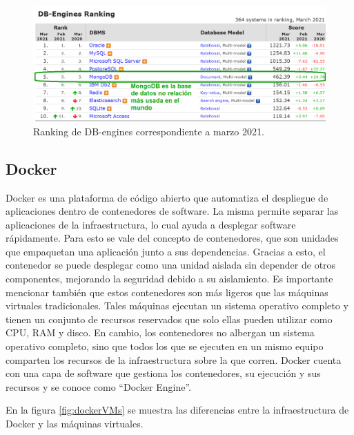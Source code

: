 \begin{figure}[ht]
	\centering
	\includegraphics[width=1\textwidth]{./Figures/mongodb.png}
	\caption{Ranking de DB-engines correspondiente a marzo 2021.}
	\label{fig:mongodb}
\end{figure} 

\subsection{Docker}

Docker es una plataforma de código abierto que automatiza el despliegue de aplicaciones dentro de contenedores de software. La misma  permite separar las aplicaciones de la infraestructura, lo cual ayuda a desplegar software rápidamente. Para esto se vale del concepto de contenedores, que son unidades que empaquetan una aplicación junto a sus dependencias. Gracias a esto, el contenedor se puede desplegar como una unidad aislada sin depender de otros componentes, mejorando la seguridad debido a su aislamiento. Es importante mencionar también que estos contenedores son más ligeros que las máquinas virtuales tradicionales. Tales máquinas ejecutan un sistema operativo completo y tienen un conjunto de recursos reservados que solo ellas pueden utilizar como CPU, RAM y disco. En cambio, los contenedores no albergan un sistema operativo completo, sino que todos los que se ejecuten en un mismo equipo comparten los recursos de la infraestructura sobre la que corren. Docker cuenta con una capa de software que gestiona los contenedores, su ejecución y sus recursos y se conoce como ``Docker Engine''.

En la figura \ref{fig:dockerVMs} se muestra las diferencias entre la infraestructura de Docker y las máquinas virtuales.

